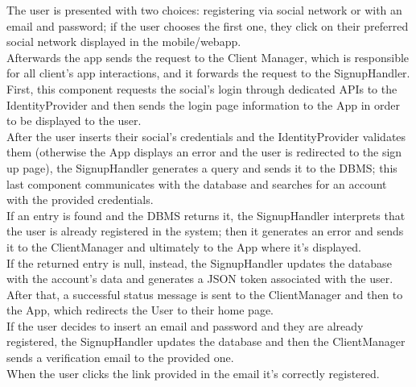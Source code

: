 \documentclass[table, 12pt]{article}
\begin{document}
The user is presented with two choices: registering via social network or with an email and password; if the user chooses the first one, they click on their preferred social network displayed in the mobile/webapp.\\
Afterwards the app sends the request to the Client Manager, which is responsible for all client's app interactions, and it forwards the request to the SignupHandler.\\
First, this component requests the social's login through dedicated APIs to the IdentityProvider and then sends the login page information to the App in order to be displayed to the user.\\
After the user inserts their social's credentials and the IdentityProvider validates them (otherwise the App displays an error and the user is redirected to the sign up page), the SignupHandler generates a query and sends it to the DBMS; this last component communicates with the database and searches for an account with the provided credentials.\\
If an entry is found and the DBMS returns it, the SignupHandler interprets that the user is already registered in the system; then it generates an error and sends it to the ClientManager and ultimately to the App where it's displayed.\\
If the returned entry is null, instead, the SignupHandler updates the database with the account's data and generates a JSON token associated with the user.\\
After that, a successful status message is sent to the ClientManager and then to the App, which redirects the User to their home page.\\
If the user decides to insert an email and password and they are already registered, the SignupHandler updates the database and then the ClientManager sends a verification email to the provided one.\\
When the user clicks the link provided in the email it's correctly registered.
\end{document}
